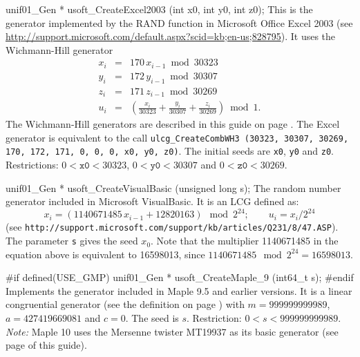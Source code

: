 {unif01_Gen * usoft_CreateExcel2003 (int x0, int y0, int z0);
\endcode
  \tab
  This is the generator implemented by the {RAND} function in
 \label{gen:Excel2003}%
%
  Microsoft Office Excel 2003
 (see \url{http://support.microsoft.com/default.aspx?scid=kb;en-us;828795}).
  It uses the Wichmann-Hill generator \cite{rWIC82a,rWIC87a}
\begin{eqnarray*}
      x_{i} &=& 170 \, x_{i-1} \bmod 30323 \\
      y_{i} &=& 172 \, y_{i-1} \bmod 30307 \\
      z_{i} &=& 171 \, z_{i-1} \bmod 30269 \\[6pt]
      u_i   &=& \left(\frac{x_i}{30323} + \frac{y_i}{30307} +
                    \frac{z_i}{30269}\right) \bmod 1.
\end{eqnarray*}
  The Wichmann-Hill generators are described in this guide on page
  \pageref{gen:Wichmann-Hill}.  The Excel generator is equivalent to the call
 \texttt{ulcg\_CreateCombWH3 (30323, 30307, 30269, 170, 172, 171,
   0, 0, 0, x0, y0, z0)}.  The initial seeds are \texttt{x0},
   \texttt{y0} and  \texttt{z0}.
 Restrictions: $0 < \texttt{x0} < 30323$,
 $0 < \texttt{y0} < 30307$ and $0 < \texttt{z0} < 30269$.
 \endtab
\code


unif01_Gen * usoft_CreateVisualBasic (unsigned long s);
\endcode
  \tab
  The random number generator included in Microsoft VisualBasic.
%
  It is an LCG defined as:
$$
    x_{i}  = (1140671485\,  x_{i-1} + 12820163) \mod 2^{24}; \qquad
    u_i = x_i / 2^{24}
$$
(see {\tt {http://support.microsoft.com/support/kb/articles/Q231/8/47.ASP}}).
  The parameter {\tt s} gives the seed $x_0$. Note that the multiplier
  1140671485 in the equation above is equivalent to 16598013, since
  $1140671485 \mod 2^{24} = 16598013$.
  \endtab
\code


#if defined(USE_GMP)
   unif01_Gen * usoft_CreateMaple_9 (int64_t s);
#endif
\endcode
  \tab Implements the generator included in {\sc Maple 9.5} and earlier versions.
  It is a linear congruential generator (see the definition on page \pageref{lcg})
  with $m=999999999989$, $a=427419669081$ and $c = 0$. The seed is $s$.
  Restriction: $0 < s < 999999999989$. {\em Note:} {\sc Maple 10} uses the
  Mersenne  twister MT19937 as its basic generator
  (see page \pageref{rng:MT19937} of this guide).
  \endtab
\code


}
